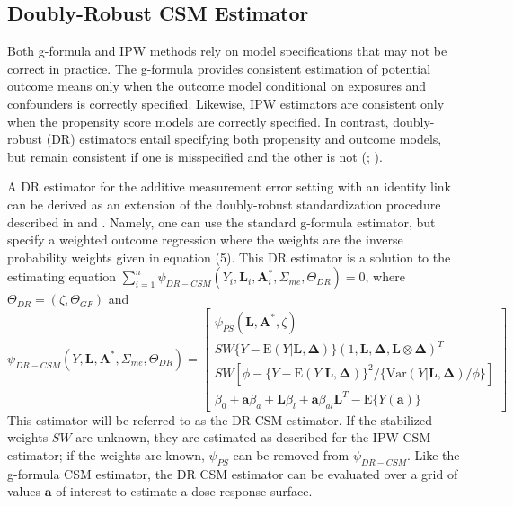 \documentclass[useAMS,usenatbib,referee]{biom}
\begin{document}
\subsection{Doubly-Robust CSM Estimator}

Both g-formula and IPW methods rely on model specifications that may not be correct in practice. The g-formula provides consistent estimation of potential outcome means only when the outcome model conditional on exposures and confounders is correctly specified. Likewise, IPW estimators are consistent only when the propensity score models are correctly specified. In contrast, doubly-robust (DR) estimators entail specifying both propensity and outcome models, but remain consistent if one is misspecified and the other is not (\citealp*{robins1994}; \citealp{lunceford2004,bang2005}).

A DR estimator for the additive measurement error setting with an identity link can be derived as an extension of the doubly-robust standardization procedure described in \citet{vansteelandt2011} and \citet{kang2007}. Namely, one can use the standard g-formula estimator, but specify a weighted outcome regression where the weights are the inverse probability weights given in equation (5). This DR estimator is a solution to the estimating equation $\sum_{i=1}^{n} \psi_{DR-CSM}(Y_{i}, \bm{L}_{i}, \bm{A}_{i}^{*}, \Sigma_{me}, \Theta_{DR}) = 0$, where $\Theta_{DR} = (\zeta, \Theta_{GF})$ and
\begin{equation}
    \psi_{DR-CSM}(Y, \bm{L}, \bm{A}^{*}, \Sigma_{me}, \Theta_{DR}) =
    \begin{bmatrix}
        \psi_{PS}(\bm{L}, \bm{A}^{*}, \zeta) \\
       SW\{ Y - \text{E}(Y | \bm{L}, \bm{\Delta}) \} (1, \bm{L}, \bm{\Delta}, \bm{L} \otimes \bm{\Delta})^{T} \\
        SW[\phi - \{ Y - \text{E}(Y | \bm{L}, \bm{\Delta}) \}^{2} / \{ \text{Var}(Y | \bm{L}, \bm{\Delta}) / \phi \}] \\
        \beta_{0} + \bm{a}\beta_{a} + \bm{L}\beta_{l} +
        \bm{a}\beta_{al}\bm{L}^{T} - \text{E} \{ Y(\bm{a}) \}
    \end{bmatrix}
\end{equation}
This estimator will be referred to as the DR CSM estimator. If the stabilized weights $SW$ are unknown, they are estimated as described for the IPW CSM estimator; if the weights are known, $\psi_{PS}$ can be removed from $\psi_{DR-CSM}$. Like the g-formula CSM estimator, the DR CSM estimator can be evaluated over a grid of values $\bm{a}$ of interest to estimate a dose-response surface.
\end{document}
